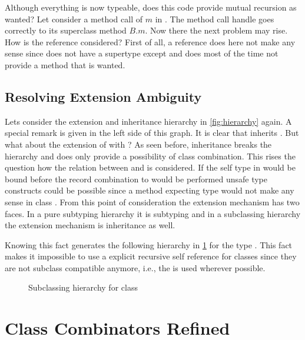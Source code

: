 Although everything is now typeable, does this code provide mutual
recursion as wanted?  Let consider a method call of $m$ in \C. The
method call handle goes correctly to its superclass method $B.m$. Now
there the next problem may rise. How is the \base reference considered?
First of all, a \base reference does here not make any sense since
\C does not have a supertype except \object and \object does most 
of the time not provide a method that is wanted.

\subsection{Resolving Extension Ambiguity}
\label{sec:resolveAmbiguity}
Lets consider the extension and inheritance hierarchy in \cref{fig:hierarchy}
again. A special remark is given in the left side of this graph. It is clear
that \E inherits \B. But what about the extension of \A 
with \B? As seen before, inheritance breaks the hierarchy and does only
provide a possibility of class combination. This rises the question how the 
relation between \A and \B is considered. If the self type in 
\A would be bound before the record combination to \E would be
performed unsafe type constructs could be possible since a method expecting 
type \A would not make any sense in class \E. From this point of 
consideration the extension mechanism has two faces. In a pure subtyping 
hierarchy it is subtyping and in a subclassing hierarchy the extension
mechanism is inheritance as well.

Knowing this fact generates the following hierarchy in \cref{fig:fixedHierarchy}
for the type \E. This fact makes it impossible to use a explicit recursive
self reference for classes since they are not subclass compatible anymore, i.e.,
the \mytype is used wherever possible.

\begin{figure}[ht]
	\centering
	\caption{Subclassing hierarchy for class \E}
	\label{fig:fixedHierarchy}
\end{figure}
%
\subsection{}

\section{Class Combinators Refined}

